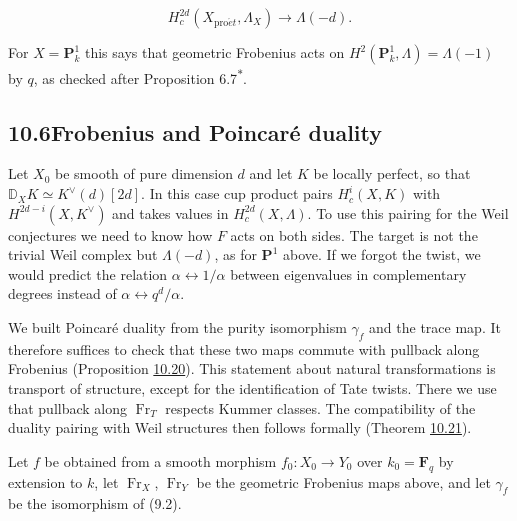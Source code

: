 \documentclass[11pt]{article}
\newcommand{\bpout}[1]{#1\textsuperscript{\hyperlink{bp-outside}{\ensuremath{\ast}}}}
\begin{document}
\[
H_c^{2d}(X_{\mathrm{pro}\acute{e}t},\Lambda_X)\longrightarrow\Lambda(-d).
\]

For \(X=\mathbf P^1_k\) this says that geometric Frobenius acts on \(H^2(\mathbf P^1_k,\Lambda)=\Lambda(-1)\) by \(q\), as checked after Proposition \bpout{6.7}.


\subsection*{\texorpdfstring{10.6\quad Frobenius and Poincaré duality}{10.6 Frobenius and Poincaré duality}}
\label{bp60}%
\label{bp61}%
Let \(X_0\) be smooth of pure dimension \(d\) and let \(K\) be locally perfect, so that \(\mathbb D_XK\simeq K^\vee(d)[2d]\). In this case cup product pairs \(H^i_c(X,K)\) with \(H^{2d-i}(X,K^\vee)\) and takes values in \(H^{2d}_c(X,\Lambda)\). To use this pairing for the Weil conjectures we need to know how \(F\) acts on both sides. The target is not the trivial Weil complex but \(\Lambda(-d)\), as for \(\mathbf P^1\) above. If we forgot the twist, we would predict the relation \(\alpha\leftrightarrow1/\alpha\) between eigenvalues in complementary degrees instead of \(\alpha\leftrightarrow q^d/\alpha\).

We built Poincaré duality from the purity isomorphism \(\gamma_f\) and the trace map. It therefore suffices to check that these two maps commute with pullback along Frobenius (Proposition \hyperref[bp62]{10.20}). This statement about natural transformations is transport of structure, except for the identification of Tate twists. There we use that pullback along \(\operatorname{Fr}_T\) respects Kummer classes. The compatibility of the duality pairing with Weil structures then follows formally (Theorem \hyperref[bp65]{10.21}).

Let \(f\) be obtained from a smooth morphism \(f_0:X_0\to Y_0\) over \(k_0=\mathbf F_q\) by extension to \(k\), let \(\operatorname{Fr}_X\), \(\operatorname{Fr}_Y\) be the geometric Frobenius maps above, and let \(\gamma_f\) be the isomorphism of (9.2).
\end{document}
